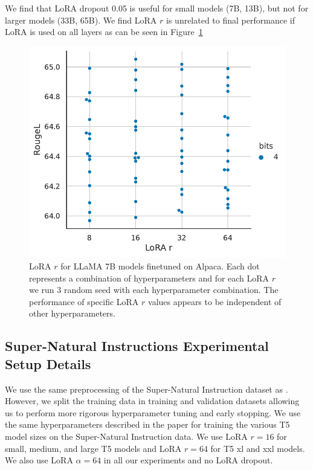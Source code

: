 \documentclass{article}
\begin{document}
We find that LoRA dropout 0.05 is useful for small models (7B, 13B), but not for larger models (33B, 65B). We find LoRA $r$ is unrelated to final performance if LoRA is used on all layers as can be seen in Figure~\ref{fig:lora_r}

\begin{figure}[h]
\centering
         \includegraphics[scale=0.42]{figures/lora_r.pdf}
        \caption{LoRA $r$ for LLaMA 7B models finetuned on Alpaca. Each dot represents a combination of hyperparameters and for each LoRA $r$ we run 3 random seed with each hyperparameter combination. The performance of specific LoRA $r$ values appears to be independent of other hyperparameters.
        }
        \label{fig:lora_r}
\end{figure}

\subsection{Super-Natural Instructions Experimental Setup Details}
We use the same preprocessing of the Super-Natural Instruction dataset as \citet{supernaturalinstructions}. However, we split the training data in training and validation datasets allowing us to perform more rigorous hyperparameter tuning and early stopping. We use the same hyperparameters described in the paper for training the various T5 model sizes on the Super-Natural Instruction data. We use LoRA $r=16$ for small, medium, and large T5 models and LoRA $r=64$ for T5 xl and xxl models. We also use LoRA $\alpha=64$ in all our experiments and no LoRA dropout.
\end{document}
